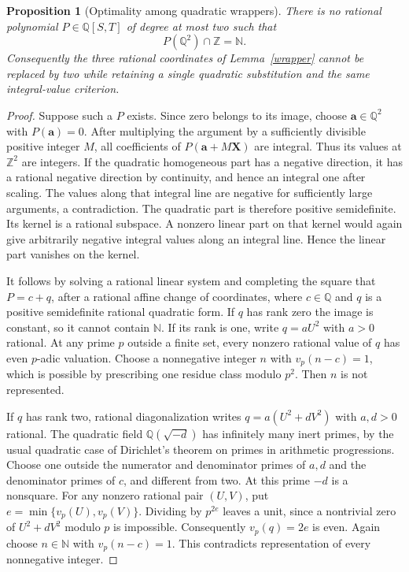 \documentclass[11pt,a4paper]{article}
\newtheorem{proposition}[theorem]{Proposition}
\newcommand{\Q}{\mathbb Q}\newcommand{\Z}{\mathbb Z}\newcommand{\N}{\mathbb N}
\begin{document}
\begin{proposition}[Optimality among quadratic wrappers]\label{wrapperoptimal}
There is no rational polynomial $P\in\Q[S,T]$ of degree at most two such that
\[
 P(\Q^2)\cap\Z=\N.
\]
Consequently the three rational coordinates of Lemma~\ref{wrapper} cannot be
replaced by two while retaining a single quadratic substitution and the same
integral-value criterion.
\end{proposition}
\begin{proof}
Suppose such a $P$ exists. Since zero belongs to its image, choose
$\mathbf a\in\Q^2$ with $P(\mathbf a)=0$. After multiplying the argument by a
sufficiently divisible positive integer $M$, all coefficients of
$P(\mathbf a+M\mathbf X)$ are integral. Thus its values at $\Z^2$ are integers.
If the quadratic homogeneous part has a negative direction, it has a rational
negative direction by continuity, and hence an integral one after scaling.
The values along that integral line are negative for sufficiently large
arguments, a contradiction. The quadratic part is therefore positive
semidefinite. Its kernel is a rational subspace. A nonzero linear part on
that kernel would again give arbitrarily negative integral values along an
integral line. Hence the linear part vanishes on the kernel.

It follows by solving a rational linear system and completing the square
that $P=c+q$, after a rational affine change of coordinates, where $c\in\Q$
and $q$ is a positive semidefinite rational quadratic form. If $q$ has rank
zero the image is constant, so it cannot contain $\N$. If its rank is one,
write $q=aU^2$ with $a>0$ rational. At any prime $p$ outside a finite set,
every nonzero rational value of $q$ has even $p$-adic valuation. Choose a
nonnegative integer $n$ with $v_p(n-c)=1$, which is possible by prescribing
one residue class modulo $p^2$. Then $n$ is not represented.

If $q$ has rank two, rational diagonalization writes
$q=a(U^2+dV^2)$ with $a,d>0$ rational. The quadratic field
$\Q(\sqrt{-d})$ has infinitely many inert primes, by the usual quadratic
case of Dirichlet's theorem on primes in arithmetic progressions. Choose
one outside the numerator and denominator primes of $a,d$ and the
denominator primes of $c$, and different
from two. At this prime $-d$ is a nonsquare. For any nonzero rational pair
$(U,V)$, put $e=\min\{v_p(U),v_p(V)\}$. Dividing by $p^{2e}$ leaves a unit,
since a nontrivial zero of $U^2+dV^2$ modulo $p$ is impossible. Consequently
$v_p(q)=2e$ is even. Again choose $n\in\N$ with $v_p(n-c)=1$. This
contradicts representation of every nonnegative integer.
\end{proof}
\end{document}
